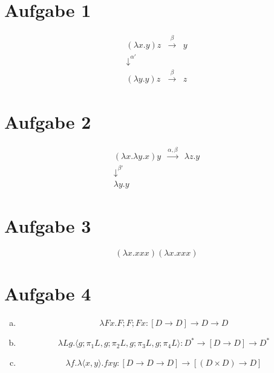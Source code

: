 




\newcommand{\nr}{8}


\section*{Aufgabe 1}

\begin{eqnarray}
(\lambda x . y) z& \overset\beta\to & y\\
\downarrow^{\alpha'}&&\\
(\lambda y . y) z& \overset\beta\to & z
\end{eqnarray}

\section*{Aufgabe 2}
\begin{eqnarray}
(\lambda x . \lambda y . x) y  & \overset{\alpha,\beta}\to & \lambda z . y\\
\downarrow^{\beta'}&\\
\lambda y . y &&
\end{eqnarray}

\section*{Aufgabe 3}
\begin{equation}
(\lambda x . x x x)(\lambda x . x x x)
\end{equation}

\section*{Aufgabe 4}
\begin{enumerate}[a)]
\item \begin{equation}
\lambda F x . F;F;F x : [D \to D] \to D \to D
\end{equation}

\item \begin{equation}
\lambda L g . \langle g; \pi_1 L, g; \pi_2 L, g; \pi_3 L, g; \pi_4 L \rangle : D^* \to [D \to D] \to D^*
\end{equation}

\item \begin{equation}
\lambda f . \lambda \langle x,y \rangle . f x y : [D \to D \to D] \to [(D \times D) \to D]
\end{equation}

\end{enumerate}


